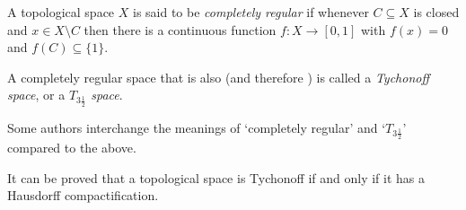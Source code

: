 \documentclass{article}
\begin{document}

A topological space $X$ is said to be \emph{completely regular} if whenever $C\subseteq X$ is closed and $x\in X\setminus C$ then there is a continuous function $f\colon X\to[0,1]$ with $f(x)=0$ and $f(C)\subseteq\{1\}$.

A completely regular space that is also  (and therefore )
is called a \emph{Tychonoff space}, or a \emph{$T_{3\frac{1}{2}}$ space}.

Some authors interchange the meanings of `completely regular' and `$T_{3\frac{1}{2}}$' compared to the above.

It can be proved that a topological space is Tychonoff
if and only if it has a Hausdorff compactification.
\end{document}
